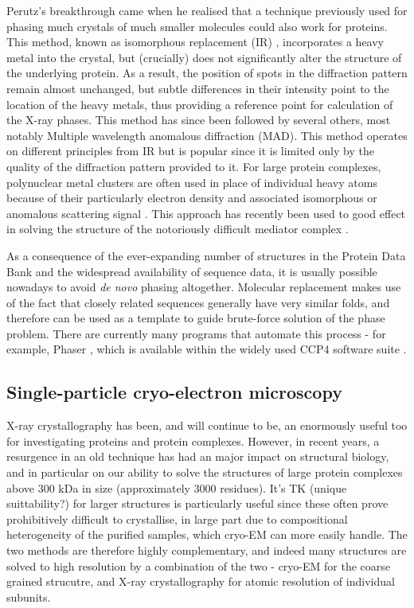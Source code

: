 \documentclass[a4paper,11pt,twoside,openright]{scrbook}
\begin{document}
Perutz's breakthrough came when he realised that a technique previously used for phasing much crystals of much smaller molecules could also work for proteins. This method, known as isomorphous replacement (IR)  \cite{Robertson1936}, incorporates a heavy metal into the crystal, but (crucially) does not significantly alter the structure of the underlying protein. As a result, the position of spots in the diffraction pattern remain almost unchanged, but subtle differences in their intensity point to the location of the heavy metals, thus providing a reference point for calculation of the X-ray phases. This method has since been followed by several others, most notably Multiple wavelength anomalous diffraction (MAD). This method operates on different principles from IR but is popular since it is limited only by the quality of the diffraction pattern provided to it. For large protein complexes, polynuclear metal clusters are often used in place of individual heavy atoms because of their particularly electron density and associated isomorphous or anomalous scattering signal \cite{Dauter2005}. This approach has recently been used to good effect in solving the structure of the notoriously difficult mediator complex \cite{Nozawa2017}.

As a consequence of the ever-expanding number of structures in the Protein Data Bank and the widespread availability of sequence data, it is usually possible nowadays to avoid \textit{de novo} phasing altogether. Molecular replacement makes use of the fact that closely related sequences generally have very similar folds, and therefore can be used as a template to guide brute-force solution of the phase problem. There are currently many programs that automate this process - for example, Phaser \cite{McCoy2007}, which is available within the widely used CCP4 software suite \cite{Winn2011a}.


\subsection{Single-particle cryo-electron microscopy}
X-ray crystallography has been, and will continue to be, an enormously useful too for investigating proteins and protein complexes. However, in recent years, a resurgence in an old technique has had an major impact on structural biology, and in particular on our ability to solve the structures of large protein complexes above 300 kDa in size (approximately 3000 residues). It's TK (unique suittability?) for larger structures is particularly useful since these often prove prohibitively difficult to crystallise, in large part due to compositional heterogeneity of the purified samples, which cryo-EM can more easily handle. The two methods are therefore highly complementary, and indeed many structures are solved to high resolution by a combination of the two - cryo-EM for the coarse grained strucutre, and X-ray crystallography for atomic resolution of individual subunits.
\end{document}
